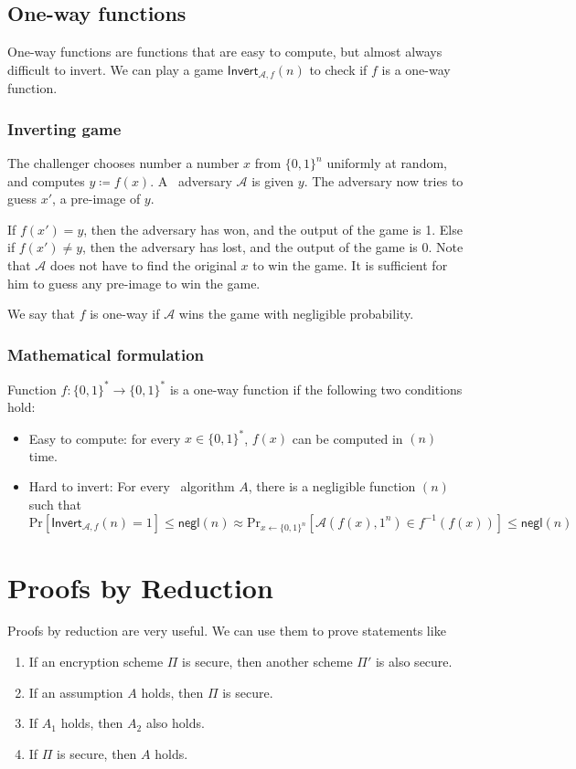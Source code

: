 \documentclass[11pt]{article}
\begin{document}
\subsection{One-way functions}
One-way functions are functions that are easy to compute, but almost always difficult to invert. We can play a game \(\mathsf{Invert}_{\mathcal{A},f} (n)\) to check if \(f\) is a one-way function. 

\subsubsection{Inverting game}

The challenger chooses number a number \(x\) from \(\{0, 1\}^n\) uniformly at random, and computes \(y \coloneqq f(x)\). A \ppt\ adversary \(\mathcal{A}\) is given \(y\). The adversary now tries to guess \(x'\), a pre-image of \(y\).

If \(f(x') = y\), then the adversary has won, and the output of the game is 1.
Else if \(f(x') \neq y\), then the adversary has lost, and the output of the game is 0. Note that \(\mathcal{A}\) does not have to find the original \(x\) to win the game. It is sufficient for him to guess any pre-image to win the game. 

We say that \(f\) is one-way if \(\mathcal{A}\) wins the game with negligible probability.

\subsubsection{Mathematical formulation}
Function \(f \colon \{0, 1\}^* \to \{0, 1\}^*\) is a {\sf one-way function}  if the following two conditions hold:
\begin{itemize}
\item Easy to compute: for every \(x \in \{0, 1\}^*\), \(f(x)\) can be computed in \poly \((n)\) time.
\item Hard to invert: For every \ppt\ algorithm \(A\), there is a negligible function \negl\((n)\) such that
  \[ \mathrm{Pr}[\mathsf{Invert}_{\mathcal{A}, f} (n) = 1] \le \mathsf{negl}(n) \approx \mathrm{Pr} _{x \leftarrow \{ 0, 1\}^n} [\mathcal{A}(f(x), 1^n) \in f^{-1} (f(x))] \le \mathsf{negl}(n) \]
\end{itemize}


\section{Proofs by Reduction}
Proofs by reduction are very useful. We can use them to prove statements like
\begin{enumerate}
    \item If an encryption scheme \(\Pi\) is secure, then another scheme \(\Pi'\) is also secure. 
    \item If an assumption \(A\) holds, then \(\Pi\) is secure. 
    \item If \(A_1\) holds, then \(A_2\) also holds.
    \item If \(\Pi\) is secure, then \(A\) holds.
\end{enumerate}
\end{document}
